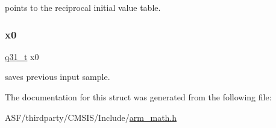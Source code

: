 points to the reciprocal initial value table. \mbox{\label{structarm__lms__norm__instance__q31_a973b8350a0c7b113a5f002bc0b86bf76}} 
\subsubsection{\texorpdfstring{x0}{x0}}
{\footnotesize\ttfamily \mbox{\hyperlink{arm__math_8h_adc89a3547f5324b7b3b95adec3806bc0}{q31\+\_\+t}} x0}

saves previous input sample. 

The documentation for this struct was generated from the following file\+:\begin{DoxyCompactItemize}
\item 
A\+S\+F/thirdparty/\+C\+M\+S\+I\+S/\+Include/\mbox{\hyperlink{arm__math_8h}{arm\+\_\+math.\+h}}\end{DoxyCompactItemize}
